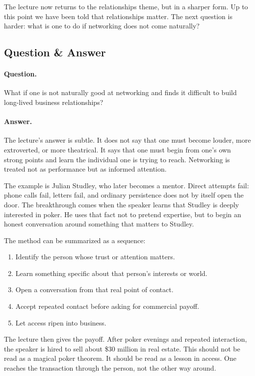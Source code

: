 The lecture now returns to the relationships theme, but in a sharper form. Up to this point we have been told that relationships matter. The next question is harder: what is one to do if networking does not come naturally?

\subsection{Question \& Answer}

\paragraph{Question.}
What if one is not naturally good at networking and finds it difficult to build long-lived business relationships?

\paragraph{Answer.}
The lecture's answer is subtle. It does not say that one must become louder, more extroverted, or more theatrical. It says that one must begin from one's own strong points and learn the individual one is trying to reach. Networking is treated not as performance but as informed attention.

The example is Julian Studley, who later becomes a mentor. Direct attempts fail: phone calls fail, letters fail, and ordinary persistence does not by itself open the door. The breakthrough comes when the speaker learns that Studley is deeply interested in poker. He uses that fact not to pretend expertise, but to begin an honest conversation around something that matters to Studley.

The method can be summarized as a sequence:
\begin{enumerate}
\item Identify the person whose trust or attention matters.
\item Learn something specific about that person's interests or world.
\item Open a conversation from that real point of contact.
\item Accept repeated contact before asking for commercial payoff.
\item Let access ripen into business.
\end{enumerate}

The lecture then gives the payoff. After poker evenings and repeated interaction, the speaker is hired to sell about \$30 million in real estate. This should not be read as a magical poker theorem. It should be read as a lesson in access. One reaches the transaction through the person, not the other way around.

